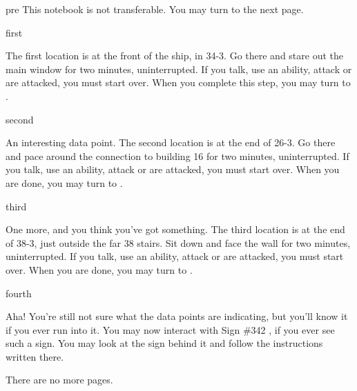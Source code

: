 \documentclass[notebook]{airship}
\begin{document}
\startnotebook{\nOpium{}}

\begin{page}{pre}
This notebook is not transferable. You may turn to the next page.
\end{page}

\begin{page}{first}

The first location is at the front of the ship, in 34-3. Go there and stare out the main window for two minutes, uninterrupted. If you talk, use an ability, attack or are attacked, you must start over. When you complete this step, you may turn to .
\end{page}

\begin{page}{second}

An interesting data point. The second location is at the end of 26-3. Go there and pace around the connection to building 16 for two minutes, uninterrupted. If you talk, use an ability, attack or are attacked, you must start over. When you are done, you may turn to .
\end{page}

\begin{page}{third}

One more, and you think you've got something. The third location is at the end of 38-3, just outside the far 38 stairs. Sit down and face the wall for two minutes, uninterrupted. If you talk, use an ability, attack or are attacked, you must start over. When you are done, you may turn to .
\end{page}

\begin{page}{fourth}

Aha! You're still not sure what the data points are indicating, but you'll know it if you ever run into it. You may now interact with Sign \#342 , if you ever see such a sign. You may look at the sign behind it and follow the instructions written there.

There are no more pages.
\end{page}


\endnotebook
\end{document}
